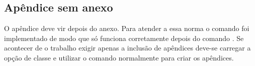 \subsection{Apêndice sem anexo}
O apêndice deve vir depois do anexo. Para atender a essa norma
o comando  foi implementado de modo que só
funciona corretamente depois do comando . Se
acontecer de o trabalho exigir apenas a inclusão de apêndices
deve-se carregar a opção de classe  e utilizar o
comando  normalmente para criar os apêndices.

